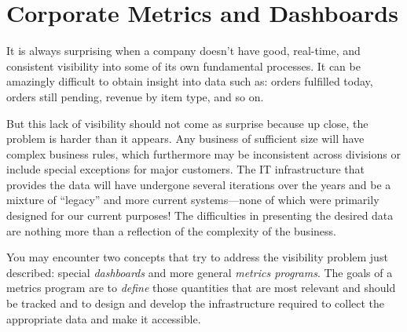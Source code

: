 


\section{Corporate Metrics and Dashboards}


It is always surprising when a company doesn't have good, real-time,
and consistent visibility into some of its own fundamental processes.
It can be amazingly difficult to obtain insight into data such as:
orders fulfilled today, orders still pending, revenue by item type,
and so on.
    
But this lack of visibility should not come as surprise because up
close, the problem is harder than it appears. Any business of
sufficient size will have complex business rules, which furthermore
may be inconsistent across divisions or include special exceptions for
major customers. The IT infrastructure that provides the data will
have undergone several iterations over the years and be a mixture of
``legacy'' and more current systems---none of which were primarily
designed for our current purposes! The difficulties in presenting the
desired data are nothing more than a reflection of the complexity of
the business.
    
You may encounter two concepts that try to address the visibility
problem just described: special \emph{dashboards} and more general
\emph{metrics programs}. The goals of a metrics program are to
\emph{define} those quantities that are most relevant and should be
tracked and to design and develop the infrastructure required to
collect the appropriate data and make it accessible.

